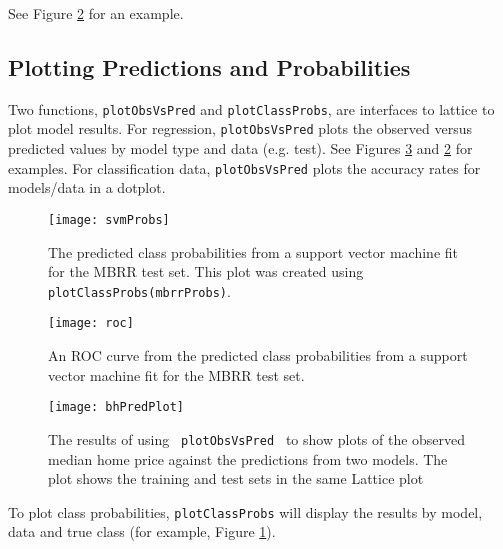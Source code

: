 \documentclass[12pt]{article}
\begin{document}
See Figure \ref{f:mbrrROC} for an example.

\subsection*{Plotting Predictions and Probabilities}

Two functions, \texttt{plotObsVsPred} and \texttt{plotClassProbs}, are interfaces to lattice to plot model results. For regression, \texttt{plotObsVsPred} plots the observed versus predicted values by model type and data (e.g. test). See Figures \ref{f:bhPredPlot} and \ref{f:mbrrROC}  for examples. For classification data, \texttt{plotObsVsPred} plots the accuracy rates for models/data in a dotplot. 



\begin{figure}
   \begin{center}      
      \texttt{[image: svmProbs]}   
      \caption{The predicted class probabilities from a support vector machine fit for the MBRR test set. This plot was created using \texttt{plotClassProbs(mbrrProbs)}.}
      \label{f:mbrrProbs}     
   \end{center}
\end{figure}  

\begin{figure}
   \begin{center}         
       \texttt{[image: roc]}   
      \caption{An ROC curve from the predicted class probabilities from a support vector machine fit for the MBRR test set. }
      \label{f:mbrrROC}       
   \end{center}
\end{figure}  

\begin{figure}
   \begin{center}      
      \texttt{[image: bhPredPlot]}   
      \caption{The results of using \texttt{ plotObsVsPred } to show plots of the observed median home price against the predictions from two models. The plot shows the training and test sets in the same Lattice plot}
      \label{f:bhPredPlot}         
   \end{center}
\end{figure}


To plot class probabilities, \texttt{plotClassProbs} will display the results by model, data and true class (for example, Figure \ref{f:mbrrProbs}).     
\end{document}
